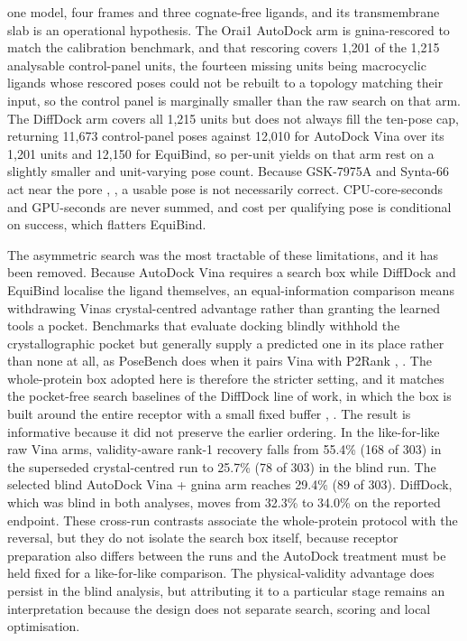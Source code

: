 one model, four frames and three cognate-free ligands, and its transmembrane slab is an operational hypothesis. The Orai1 AutoDock arm is gnina-rescored to match the calibration benchmark, and that rescoring covers 1,201 of the 1,215 analysable control-panel units, the fourteen missing units being macrocyclic ligands whose rescored poses could not be rebuilt to a topology matching their input, so the control panel is marginally smaller than the raw search on that arm. The DiffDock arm covers all 1,215 units but does not always fill the ten-pose cap, returning 11,673 control-panel poses against 12,010 for AutoDock Vina over its 1,201 units and 12,150 for EquiBind, so per-unit yields on that arm rest on a slightly smaller and unit-varying pose count. Because GSK-7975A and Synta-66 act near the pore \cite{ref070}, \cite{ref071}, a usable pose is not necessarily correct. CPU-core-seconds and GPU-seconds are never summed, and cost per qualifying pose is conditional on success, which flatters EquiBind.

The asymmetric search was the most tractable of these limitations, and it has been removed. Because AutoDock Vina requires a search box while DiffDock and EquiBind localise the ligand themselves, an equal-information comparison means withdrawing Vina\textquotesingle s crystal-centred advantage rather than granting the learned tools a pocket. Benchmarks that evaluate docking blindly withhold the crystallographic pocket but generally supply a predicted one in its place rather than none at all, as PoseBench does when it pairs Vina with P2Rank \cite{ref069}, \cite{ref061}. The whole-protein box adopted here is therefore the stricter setting, and it matches the pocket-free search baselines of the DiffDock line of work, in which the box is built around the entire receptor with a small fixed buffer \cite{ref024}, \cite{ref091}. The result is informative because it did not preserve the earlier ordering. In the like-for-like raw Vina arms, validity-aware rank-1 recovery falls from 55.4\% (168 of 303) in the superseded crystal-centred run to 25.7\% (78 of 303) in the blind run. The selected blind AutoDock Vina + gnina arm reaches 29.4\% (89 of 303). DiffDock, which was blind in both analyses, moves from 32.3\% to 34.0\% on the reported endpoint. These cross-run contrasts associate the whole-protein protocol with the reversal, but they do not isolate the search box itself, because receptor preparation also differs between the runs and the AutoDock treatment must be held fixed for a like-for-like comparison. The physical-validity advantage does persist in the blind analysis, but attributing it to a particular stage remains an interpretation because the design does not separate search, scoring and local optimisation.

